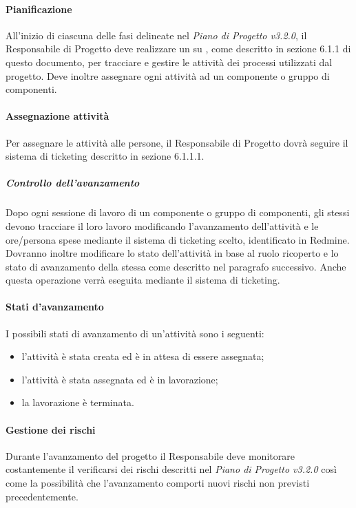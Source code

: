 \paragraph{Pianificazione}
\label{}
All'inizio di ciascuna delle fasi delineate nel \emph{Piano di Progetto v3.2.0}, il Responsabile di Progetto deve realizzare un  su , come descritto in sezione 6.1.1 di questo documento, per tracciare e gestire le attività dei processi utilizzati dal progetto.
Deve inoltre assegnare ogni attività ad un componente o gruppo di componenti.
\paragraph{Assegnazione attività}
Per assegnare le attività alle persone, il Responsabile di Progetto dovrà seguire il sistema di ticketing descritto in sezione 6.1.1.1.
\subparagraph{Controllo dell'avanzamento}
\label{}
Dopo ogni sessione di lavoro di un componente o gruppo di componenti, gli stessi devono tracciare il loro lavoro modificando l'avanzamento dell'attività e le ore/persona spese mediante il sistema di ticketing scelto, identificato in Redmine.
Dovranno inoltre modificare lo stato dell'attività in base al ruolo ricoperto e lo stato di avanzamento della stessa come descritto nel paragrafo successivo. Anche questa operazione verrà eseguita mediante il sistema di ticketing.
\paragraph{Stati d'avanzamento}
\label{}
I possibili stati di avanzamento di un'attività sono i seguenti:
\begin{itemize}
\item {} l'attività è stata creata ed è in attesa di essere assegnata;
\item {} l'attività è stata assegnata ed è in lavorazione;
\item {} la lavorazione è terminata.
\end{itemize}

\paragraph{Gestione dei rischi}
\label{}
Durante l'avanzamento del progetto il Responsabile  deve monitorare costantemente il verificarsi dei rischi descritti nel \emph{Piano di Progetto v3.2.0} così come la possibilità che l'avanzamento comporti nuovi rischi non previsti precedentemente.

